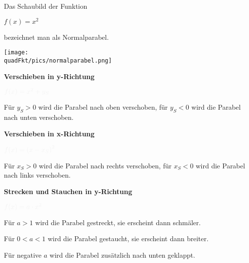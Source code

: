\begin{minipage}{\textwidth}
\begin{minipage}{0.5\textwidth}\centering\Large
	\textcolor{loes}{Das Schaubild der Funktion}
	
	\textcolor{loes}{\(f(x)=x^2\)}
	
	\textcolor{loes}{bezeichnet man als Normalparabel.}
\end{minipage}%
\begin{minipage}{0.5\textwidth}
	\texttt{[image: \\quadFkt/pics/normalparabel.png]}
\end{minipage}%
\end{minipage}
\textbf{Verschieben in y-Richtung}
\begin{tcolorbox}\centering
	\(\textcolor{loestc}{f(x)=x^2+y_S}\)
\end{tcolorbox}
\textcolor{loes}{Für \(y_S>0\) wird die Parabel nach oben verschoben, für \(y_S<0\) wird die Parabel nach unten verschoben.}

\bigskip

\textbf{Verschieben in x-Richtung}
\begin{tcolorbox}\centering
	\(\textcolor{loestc}{f(x)=\left(x-x_S\right)^2}\)
\end{tcolorbox}
\textcolor{loes}{Für \(x_S>0\) wird die Parabel nach rechts verschoben, für \(x_S<0\) wird die Parabel nach links verschoben.}

\bigskip

\textbf{Strecken und Stauchen in y-Richtung}
\begin{tcolorbox}\centering
	\(\textcolor{loestc}{f(x)=a\cdot x^2}\)
\end{tcolorbox}
\textcolor{loes}{Für \(a>1\) wird die Parabel gestreckt, sie erscheint dann schmäler.}

\textcolor{loes}{Für \(0<a<1\) wird die Parabel gestaucht, sie erscheint dann breiter.}

\textcolor{loes}{Für negative \(a\) wird die Parabel zusätzlich nach unten geklappt.}

\bigskip

